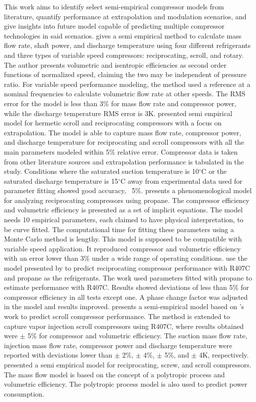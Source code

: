 \documentclass[preprint,11pt,authoryear]{elsarticle}
\begin{document}
This work aims to identify select semi-empirical compressor models from literature, quantify performance at extrapolation and modulation scenarios, and give insights into future model capable of predicting multiple compressor technologies in said scenarios. \cite{Li2012} gives a semi empirical method to calculate mass flow rate, shaft power, and discharge temperature using four different refrigerants and three types of variable speed compressors: reciprocating, scroll, and rotary. The author presents volumetric and isentropic efficiencies as second order functions of normalized speed, claiming the two may be independent of pressure ratio. For variable speed performance modeling, the method used a reference at a nominal frequencies to calculate volumetric flow rate at other speeds. The RMS error for the model is less than 3\% for mass flow rate and compressor power, while the discharge temperature RMS error is 3K. \cite{Li2012a} presented semi empirical model for hermetic scroll and reciprocating compressors with a focus on extrapolation. The model is able to capture mass flow rate, compressor power, and discharge temperature for reciprocating and scroll compressors with all the main parameters modeled within 5\% relative error. Compressor data is taken from other literature sources and extrapolation performance is tabulated in the study. Conditions where the saturated suction temperature is 10$^{\circ}$C or the saturated discharge temperature is 15$^{\circ}$C away from experimental data used for parameter fitting showed good accuracy, ~5\%. \cite{Navarro2007} presents a phenomenological model for analyzing reciprocating compressors using propane. The compressor efficiency and volumetric efficiency is presented as a set of implicit equations. The model needs 10 empirical parameters, each claimed to have physical interpretation, to be curve fitted. The computational time for fitting these parameters using a Monte Carlo method is lengthy. This model is supposed to be compatible with variable speed application. It reproduced compressor and volumetric efficiency with an error lower than 3\% under a wide range of operating conditions. \cite{Corber2007} use the model presented by \cite{Navarro2007} to predict reciprocating compressor performance with R407C and propane as the refrigerants. The work used parameters fitted with propane to estimate performance with R407C. Results showed deviations of less than 5\% for compressor efficiency in all tests except one. A phase change factor was adjusted in the model and results improved. \cite{Tello-Oquendo2019a} presents a semi-empirical model based on \cite{Navarro2007}'s work to predict scroll compressor performance. The method is extended to capture vapor injection scroll compressors using R407C, where results obtained were $\pm$ 5\% for compressor and volumetric efficiency. The suction mass flow rate, injection mass flow rate, compressor power and discharge temperature were reported with deviations lower than $\pm$ 2\%, $\pm$ 4\%, $\pm$ 5\%, and $\pm$ 4K, respectively. \cite{Mackensen2002} presented a semi empirical model for reciprocating, screw, and scroll compressors. The mass flow model is based on the concept of a polytropic process and volumetric efficiency. The polytropic process model is also used to predict power consumption. 
\end{document}
